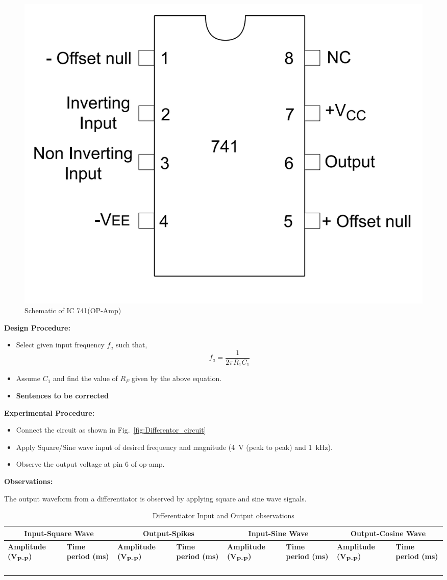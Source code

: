 \documentclass[9pt]{scrreprt}
\begin{document}
\begin{figure}[H]
	\centering
	\includegraphics[width=0.4\linewidth]{logos/IC741.png}
	\caption{Schematic of IC 741(OP-Amp)}
	\label{fig:IC 741(OP-Amp)}
\end{figure}

\textbf{Design Procedure:}
\begin{itemize}
\item Select given input frequency $f_a$ such that,
\begin{equation*}
f_a = \frac{1}{2\pi R_1 C_1}
\end{equation*}
\item Assume $C_1$ and find the value of $R_F$ given by the above equation.
\item \textbf{Sentences to be corrected}
\end{itemize}

\textbf{Experimental Procedure:}
\begin{itemize}
\item Connect the circuit as shown in Fig.~\ref{fig:Differentor_circuit}
\item Apply Square/Sine wave input of desired frequency and magnitude (4~V (peak to peak) and 1~kHz).
\item Observe the output voltage at pin 6 of op-amp.
\end{itemize}

\textbf{Observations:}

\par The output waveform from a differentiator is observed by applying square and sine wave signals.

\begin{table}[H]
\centering
\caption{Differentiator Input and Output observations}
\begin{tabularx}{\textwidth}{|X|X|X|X|X|X|X|X|}
\hline
\multicolumn{2}{|c|}{\textbf{Input-Square Wave}} & \multicolumn{2}{c|}{\textbf{Output-Spikes}} & \multicolumn{2}{c|}{\textbf{Input-Sine Wave}} & \multicolumn{2}{c|}{\textbf{Output-Cosine Wave}} \\ \hline
\textbf{Amplitude (V\textsubscript{P-P})} & \textbf{Time period (ms)} & \textbf{Amplitude (V\textsubscript{P-P})} & \textbf{Time period (ms)} & \textbf{Amplitude (V\textsubscript{P-P})} & \textbf{Time period (ms)} & \textbf{Amplitude (V\textsubscript{P-P})} & \textbf{Time period (ms)} \\ \hline
& & & & & & & \\ \hline
& & & & & & & \\ \hline
& & & & & & & \\ \hline
& & & & & & & \\ \hline
\end{tabularx}
\label{tab:Differentiator Input and Output observations}
\end{table}
\end{document}

